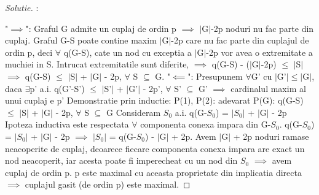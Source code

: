 \documentclass[12pt]{article}
\newenvironment{problema}[2][Problema]{\begin{trivlist}
\item[\hskip \labelsep {\bfseries #1}\hskip \labelsep {\bfseries #2.}]}{\end{trivlist}}
\begin{document}
\newpage

\begin{problema}{2}
\end{problema}
 
\begin{proof}[Solutie]: \newline

"$\implies$":
\newline
Graful G admite un cuplaj de ordin p $\implies$ $\vert$G$\vert$-2p noduri nu fac parte din cuplaj. Graful G-S poate contine maxim $\vert$G$\vert$-2p care nu fac parte din cuplajul de ordin p, deci $\forall$ q(G-S), cate un nod cu exceptia a $\vert$G$\vert$-2p vor avea o extremitate a muchiei in S. Intrucat extremitatile sunt diferite, $\implies$ q(G-S) - ($\vert$G$\vert$-2p) $\leq$ $\vert$S$\vert$ $\implies$ q(G-S) $\leq$ $\vert$S$\vert$ + $\vert$G$\vert$ - 2p, $\forall$ S $\subseteq$ G.
\newline\newline
"$\impliedby$":
\newline
Presupunem $\forall$G' cu $\vert$G'$\vert$$\leq$$\vert$G$\vert$, daca $\exists$p' a.i. q(G'-S') $\leq$ $\vert$S'$\vert$ + $\vert$G'$\vert$ - 2p', $\forall$ S' $\subseteq$ G' $\implies$ cardinalul maxim al unui cuplaj e p'
\newline
Demonstratie prin inductie:
\newline
P(1), P(2): adevarat
\newline
P(G): q(G-S) $\leq$ $\vert$S$\vert$ + $\vert$G$\vert$ - 2p, $\forall$ S $\subseteq$ G
\newline
Consideram $S_0$ a.i. q(G-$S_0$) = $\vert$$S_0$$\vert$ + $\vert$G$\vert$ - 2p
\newline
Ipoteza inductiva este respectata $\forall$ componenta conexa impara din G-$S_0$.
\newline
q(G-$S_0$) = $\vert$$S_0$$\vert$ + $\vert$G$\vert$ - 2p $\implies$ $\vert$$S_0$$\vert$ = q(G-$S_0$) - $\vert$G$\vert$ + 2p. Avem $\vert$G$\vert$ + 2p noduri ramase neacoperite de cuplaj, deoarece fiecare componenta conexa impara are exact un nod neacoperit, iar acesta poate fi imperecheat cu un nod din $S_0$ $\implies$ avem cuplaj de ordin p.
\newline
p este maximal cu aceasta proprietate din implicatia directa $\implies$ cuplajul gasit (de ordin p) este maximal.

\end{proof}

\newpage

\begin{problema}{3}
\end{problema}
 
\end{document}
